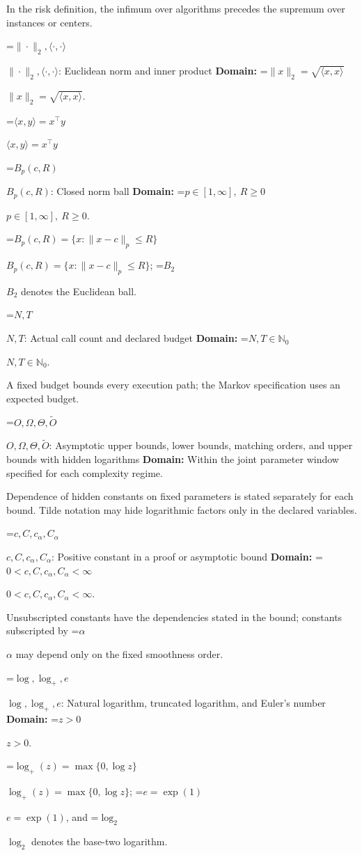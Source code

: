 \documentclass[10pt,a4paper]{article}
\newcommand{\AtlasMath}[1]{\par\begingroup\centering\setbox0=\hbox{$\displaystyle #1$}\ifdim\wd0>1.4\linewidth\typeout{ATLAS WIDE FORMULA: \the\wd0}\fi\ifdim\wd0>\linewidth\resizebox{\linewidth}{!}{\box0}\else\box0\fi\par\endgroup}
\newcommand{\AtlasInlineMath}[1]{\begingroup\setbox0=\hbox{$#1$}\ifdim\wd0>.4\linewidth\endgroup\AtlasMath{#1}\else\endgroup$#1$\fi}
\begin{document}
In the risk definition, the infimum over algorithms precedes the supremum over instances or centers.



\AtlasInlineMath{\|\cdot\|_2,\langle\cdot,\cdot\rangle}: Euclidean norm and inner product \textbf{Domain:} \AtlasInlineMath{\|x\|_2=\sqrt{\langle x,x\rangle}}.



\AtlasInlineMath{\langle x,y\rangle=x^\top y}



\AtlasInlineMath{B_p(c,R)}: Closed norm ball \textbf{Domain:} \AtlasInlineMath{p\in[1,\infty],\ R\ge0}.



\AtlasInlineMath{B_p(c,R)=\{x:\|x-c\|_p\le R\}}; \AtlasInlineMath{B_2} denotes the Euclidean ball.



\AtlasInlineMath{N,T}: Actual call count and declared budget \textbf{Domain:} \AtlasInlineMath{N,T\in\mathbb{N}_0}.



A fixed budget bounds every execution path; the Markov specification uses an expected budget.



\AtlasInlineMath{O,\Omega,\Theta,\widetilde{O}}: Asymptotic upper bounds, lower bounds, matching orders, and upper bounds with hidden logarithms \textbf{Domain:} Within the joint parameter window specified for each complexity regime.



Dependence of hidden constants on fixed parameters is stated separately for each bound. Tilde notation may hide logarithmic factors only in the declared variables.



\AtlasInlineMath{c,C,c_\alpha,C_\alpha}: Positive constant in a proof or asymptotic bound \textbf{Domain:} \AtlasInlineMath{0<c,C,c_\alpha,C_\alpha<\infty}.



Unsubscripted constants have the dependencies stated in the bound; constants subscripted by \AtlasInlineMath{\alpha} may depend only on the fixed smoothness order.



\AtlasInlineMath{\log,\log_+,e}: Natural logarithm, truncated logarithm, and Euler's number \textbf{Domain:} \AtlasInlineMath{z>0}.



\AtlasInlineMath{\log_+(z)=\max\{0,\log z\}}; \AtlasInlineMath{e=\exp(1)}, and \AtlasInlineMath{\log_2} denotes the base-two logarithm.
\end{document}
